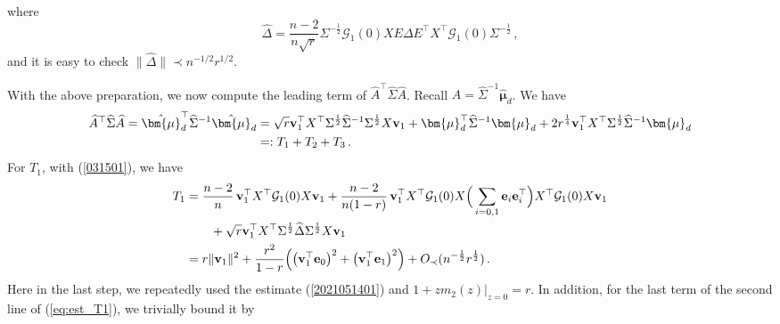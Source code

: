 \documentclass[12pt]{article}
\numberwithin{equation}{section}
\theoremstyle{remark}
\newcommand{\1}{{\rm 1}\kern-0.24em{\rm I}}
\begin{document}
\begin{appendices}
\begin{align}
\end{align}
where  
$$\widehat \Delta=\frac{n-2}{n\sqrt{r}} \Sigma^{-\frac12}\mathcal{G}_1(0)XE\Delta E^{\top}X^{\top}\mathcal{G}_1(0)\Sigma^{-\frac12}\,, $$
and it is easy to check $\|\widehat \Delta \|\prec n^{-1/2}r^{1/2} $.



With the above preparation, we now compute the leading term of $\widehat A^{\top} \widehat \Sigma \widehat A$. Recall $\widehat A= \widehat \Sigma^{-1}\hat {\bm{\mu}}_d$.  We have
\begin{align}\label{def:rewrite AhSigmaA}
\widehat A^{\top} \widehat \Sigma \widehat A = \hat {\bm{\mu}}_d^{\top}  \widehat \Sigma^{-1}  \hat {\bm{\mu}}_d  &= \sqrt r{\bf v}_1^{\top}  {X}^{\top} \Sigma^{\frac 12} \widehat \Sigma^{-1} \Sigma^{\frac 12}   {X} {\bf v}_1 +{\bm{\mu}}_d^{\top}  \widehat \Sigma^{-1}   {\bm{\mu}}_d  + 2  r^{\frac 14} {\bf v}_1^{\top} {X}^{\top} \Sigma^{\frac 12}\widehat \Sigma^{-1}   {\bm{\mu}}_d \notag\\
&=:T_1+ T_2+T_3\,.
\end{align}
For $T_1$, with (\ref{031501}), we have
\begin{align}\label{eq:est_T1}
T_1 
& = \frac {n-2}{n}\,   {\bf v}_1^{\top}{X}^{\top} \mathcal{G}_1(0){X} {\bf v}_1
+  \frac {n-2}{n(1-r)}\,   {\bf v}_1^{\top}{X}^{\top} \mathcal{G}_1(0){X}\Big( \sum_{i=0,1} {\bf e}_i {\bf e}_i^{\top}  \Big) {X}^{\top} \mathcal{G}_1(0){X} {\bf v}_1 \notag\\
&\qquad + \sqrt r {\bf v}_1^{\top}{X}^{\top} \Sigma^{\frac 12} \widehat \Delta \Sigma^{\frac 12}  {X} {\bf v}_1 \notag\\
&= r \Vert {\bf v}_1\Vert^2  + \frac{r^2}{1-r}\Big(\big({\bf v}_1^{\top} {\bf e}_0\big)^2 + \big({\bf v}_1^{\top} {\bf e}_1\big)^2 \Big) + O_\prec(n^{-\frac 12}r^{\frac 12})\,.
 \end{align}
 Here in the last step, we repeatedly used the estimate (\ref{2021051401}) and $1+ zm_2(z)|_{z=0}= r $. In addition, for the last term of the second line of (\ref{eq:est_T1}), we trivially bound it by 

\end{appendices}
\end{document}
